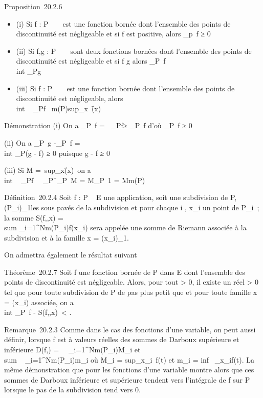 \documentclass[]{article}
\begin{document}
Proposition~20.2.6

\begin{itemize}
\itemsep1pt\parskip0pt
\item
  (i) Si f : P \rightarrow~ ~ est une fonction bornée dont l'ensemble des points de
  discontinuité est négligeable et si f est positive, alors
  \int  _p~f ≥ 0
\item
  (ii) Si f,g : P \rightarrow~ ~ sont deux fonctions bornées dont l'ensemble des
  points de discontinuité est négligeable et si f \leq g alors
  \int  _P~f \leq\\int
   _Pg
\item
  (iii) Si f : P \rightarrow~ ~ est une fonction bornée dont l'ensemble des points
  de discontinuité est négligeable, alors
  \\int ~
  _Pf\ \leq
  m(P)sup_x\inP~\f(x)\.
\end{itemize}

Démonstration (i) On a \int  _P~f
=\int ~
_Pf≥\left
\int  _P~f\right
 d'où \int  _P~f ≥ 0

(ii) On a \int  _P~g
-\int  _P~f =\\int
 _P(g - f) ≥ 0 puisque g - f ≥ 0

(iii) Si M =\
sup_x\inP\f(x)\,
on a \\int ~
_Pf\ \leq\int ~
_P\f\
\leq\int  _P~M =
M\int  _P~1 = Mm(P)

Définition~20.2.4 Soit f : P \rightarrow~ E une application, soit \sigma une subdivision
de P, (P_i)_1\leqi\leqN les sous pavés de la subdivision et
pour chaque i \in [1,N], x_i un point de P_i~; la
somme S(f,\sigma,x) =\ \\sum
 _i=1^Nm(P_i)f(x_i) sera appelée une
somme de Riemann associée à la subdivision \sigma et à la famille x =
(x_i)_1\leqi\leqN.

On admettra également le résultat suivant

Théorème~20.2.7 Soit f une fonction bornée de P dans E dont l'ensemble
des points de discontinuité est négligeable. Alors, pour tout \epsilon
> 0, il existe un réel \eta > 0 tel que pour
toute subdivision \sigma de P de pas plus petit que \eta et pour toute famille x
= (x_i) associée, on a
\\int  _P~f -
S(f,\sigma,x)\ < \epsilon.

Remarque~20.2.3 Comme dans le cas des fonctions d'une variable, on peut
aussi définir, lorsque f est à valeurs réelles des sommes de Darboux
supérieure et inférieure D(f,\sigma) =\
\sum ~
_i=1^Nm(P_i)M_i et
\\sum ~
_i=1^Nm(P_i)m_i où M_i
= sup_x\inP_i~f(t) et
m_i = inf~
_x\inP_if(t). La même démonstration que pour les fonctions
d'une variable montre alors que ces sommes de Darboux inférieure et
supérieure tendent vers l'intégrale de f sur P lorsque le pas de la
subdivision tend vers 0.
\end{document}
